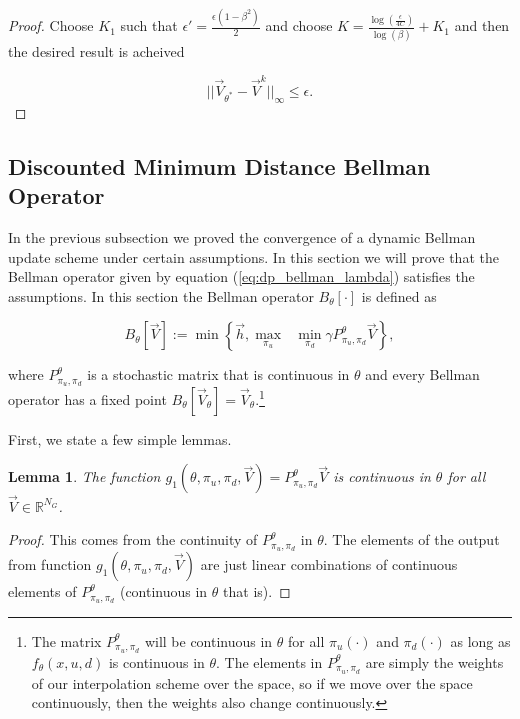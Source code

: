 \documentclass{journal}
\newcommand{\RR}{\mathbb{R}}
\newtheorem{lemma}{Lemma}
\begin{document}
\begin{proof}
\noindent  Choose $K_1$ such that  $\epsilon' =\frac{\epsilon(1-\beta^2)}{2}$ and choose $K= \frac{\log(\frac{\epsilon}{4C})}{\log(\beta)} +K_1$ and then the desired result is acheived

\begin{equation*}
||\vec{V}_{\theta^*}-\vec{V}^{k}||_{\infty}\leq \epsilon.
\end{equation*}
\end{proof}


\subsection{Discounted Minimum Distance Bellman Operator}
In the previous subsection we proved the convergence of a dynamic Bellman update scheme under certain assumptions. In this section we will prove that the Bellman operator given by equation (\ref{eq:dp_bellman_lambda}) satisfies the assumptions. In this section the Bellman operator $B_{\theta}[\cdot]$ is defined as

\begin{equation}
B_{\theta}[\vec{V}] := \min\left\{ \vec{h}, \underset{\pi_u}{\max}\text{ }\underset{ \pi_d}{\min} \gamma P^{\theta}_{\pi_u, \pi_d} \vec{V} \right \},
\end{equation}

\noindent where $P^{\theta}_{\pi_u, \pi_d}$ is a stochastic matrix that is continuous in $\theta$ and every Bellman operator has a fixed point $B_{\theta}[\vec{V}_{\theta}]=\vec{V}_{\theta}$.\footnote{The matrix $P^{\theta}_{\pi_u, \pi_d}$ will be continuous in $\theta$ for all $\pi_u(\cdot)$ and $\pi_d(\cdot)$ as long as $f_{\theta}(x,u,d)$ is continuous in $\theta$. The elements in $P^{\theta}_{\pi_u, \pi_d}$ are simply the weights of our interpolation scheme over the space, so if we move over the space continuously, then the weights also change continuously.}

First, we state a few simple lemmas.
\begin{lemma}
The function $g_1(\theta,\pi_u,\pi_d,\vec{V})=  P^{\theta}_{\pi_u, \pi_d} \vec{V}$ is continuous in $\theta$ for all $\vec{V}\in \RR^{N_G}$.
\end{lemma}

\begin{proof}
This comes from the continuity of $P^{\theta}_{\pi_u, \pi_d}$ in $\theta$. The elements of the output from function $g_1(\theta,\pi_u,\pi_d,\vec{V})$ are just linear combinations of continuous elements of $P^{\theta}_{\pi_u, \pi_d}$ (continuous in $\theta$ that is).
\end{proof}
\end{document}
